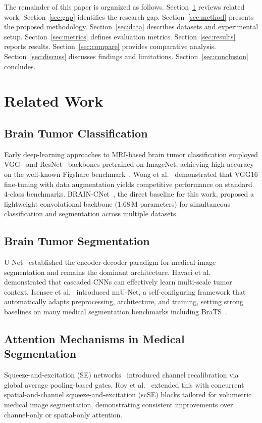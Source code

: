 \documentclass[journal]{IEEEtran}
\begin{document}
The remainder of this paper is organized as follows. Section~\ref{sec:related}
reviews related work. Section~\ref{sec:gap} identifies the research gap.
Section~\ref{sec:method} presents the proposed methodology. Section~\ref{sec:data}
describes datasets and experimental setup. Section~\ref{sec:metrics} defines
evaluation metrics. Section~\ref{sec:results} reports results. Section~\ref{sec:compare}
provides comparative analysis. Section~\ref{sec:discuss} discusses findings and
limitations. Section~\ref{sec:conclusion} concludes.

\section{Related Work}
\label{sec:related}

\subsection{Brain Tumor Classification}
Early deep-learning approaches to MRI-based brain tumor classification
employed VGG~\cite{simonyan2015vgg} and ResNet~\cite{he2016resnet} backbones
pretrained on ImageNet, achieving high accuracy on the well-known Figshare
benchmark~\cite{cheng2015enhanced}. Wong et al.~\cite{wong2025vgg} demonstrated
that VGG16 fine-tuning with data augmentation yields competitive performance
on standard 4-class benchmarks. BRAIN-CNet~\cite{musthafa2026braincnet}, the
direct baseline for this work, proposed a lightweight convolutional backbone
(1.68\,M parameters) for simultaneous classification and segmentation across
multiple datasets.

\subsection{Brain Tumor Segmentation}
U-Net~\cite{ronneberger2015unet} established the encoder-decoder paradigm for
medical image segmentation and remains the dominant architecture. Havaei
et al.~\cite{havaei2017brain} demonstrated that cascaded CNNs can effectively
learn multi-scale tumor context. Isensee et al.~\cite{isensee2021nnu}
introduced nnU-Net, a self-configuring framework that automatically adapts
preprocessing, architecture, and training, setting strong baselines on many
medical segmentation benchmarks including BraTS~\cite{menze2015brats}.

\subsection{Attention Mechanisms in Medical Segmentation}
Squeeze-and-excitation (SE) networks~\cite{hu2018senet} introduced channel
recalibration via global average pooling-based gates. Roy et
al.~\cite{roy2019concurrent} extended this with concurrent spatial-and-channel
squeeze-and-excitation (scSE) blocks tailored for volumetric medical image
segmentation, demonstrating consistent improvements over channel-only or
spatial-only attention.
\end{document}
